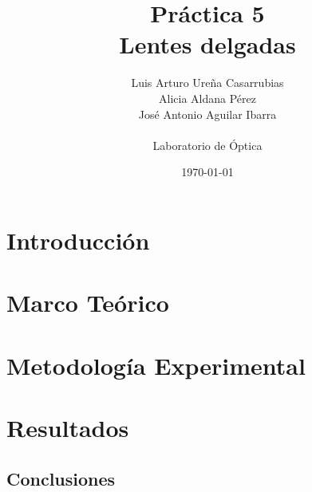 \documentclass[11pt, spanish]{article}
\title{
	\textbf{Práctica 5\\
Lentes delgadas}
}
\author{Luis Arturo Ureña Casarrubias\\
Alicia Aldana Pérez\\
José Antonio Aguilar Ibarra\\\\
Laboratorio de Óptica}
\date{\today}
\begin{document}
\maketitle

\abstract{
}

\begin{multicols}{2}

\section{Introducción}


\section{Marco Teórico}\label{sec: teo}


\section{Metodología Experimental}


\section{Resultados} \label{sec: res}
\end{multicols}


\begin{multicols}{2}
\section{Conclusiones}



\end{multicols}
\nocite{*}
\printbibliography
\end{document}
